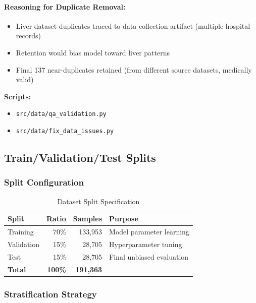 \documentclass[12pt,a4paper]{article}
\begin{document}
\paragraph{Reasoning for Duplicate Removal:}
\begin{itemize}
    \item Liver dataset duplicates traced to data collection artifact (multiple hospital records)
    \item Retention would bias model toward liver patterns
    \item Final 137 near-duplicates retained (from different source datasets, medically valid)
\end{itemize}

\textbf{Scripts:}
\begin{itemize}
    \item \texttt{src/data/qa\_validation.py}
    \item \texttt{src/data/fix\_data\_issues.py}
\end{itemize}

\subsection{Train/Validation/Test Splits}

\subsubsection{Split Configuration}

\begin{table}[H]
\centering
\caption{Dataset Split Specification}
\begin{tabular}{lrrl}
\toprule
\textbf{Split} & \textbf{Ratio} & \textbf{Samples} & \textbf{Purpose} \\
\midrule
Training & 70\% & 133,953 & Model parameter learning \\
Validation & 15\% & 28,705 & Hyperparameter tuning \\
Test & 15\% & 28,705 & Final unbiased evaluation \\
\midrule
\textbf{Total} & \textbf{100\%} & \textbf{191,363} & \\
\bottomrule
\end{tabular}
\end{table}

\subsubsection{Stratification Strategy}
\end{document}
